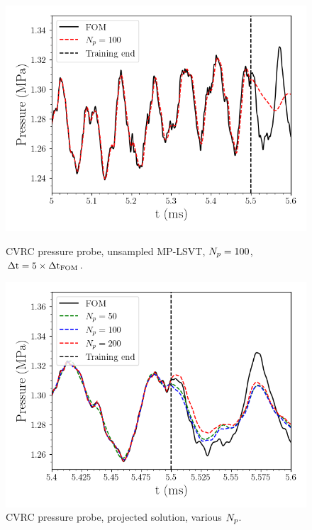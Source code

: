 \begin{figure}
    \begin{minipage}{0.45\linewidth}
        \includegraphics[width=0.99\linewidth]{Chapters/AdaptiveResults/Images/cvrc/pressure_probe_static_future.png}
        \caption{\label{fig:cvrcStaticFutureState}CVRC pressure probe, unsampled MP-LSVT, $N_p = 100$, $\Delta \text{t} = 5 \times \Delta \text{t}_{\text{FOM}}$.}
    \end{minipage}
    \hspace{0.5em}
    \begin{minipage}{0.45\linewidth}
        \includegraphics[width=0.99\linewidth]{Chapters/AdaptiveResults/Images/cvrc/pressure_probe_projection.png}
        \caption{\label{fig:cvrcStaticProjProbe}CVRC pressure probe, projected solution, various $N_p$.}
    \end{minipage}
\end{figure}

